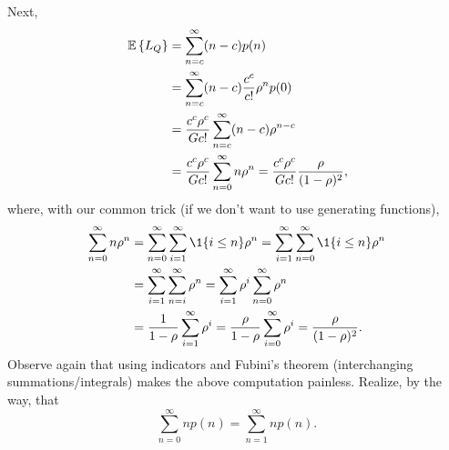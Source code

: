 \begin{question}
\begin{solution}
Next, 
\begin{equation*}
  \begin{split}
  \,\mathbb{E}\left\{L_Q\right\} 
&=\sum_{n=c}^\infty (n-c) p(n) \\
&=\sum_{n=c}^\infty (n-c) \frac{c^c}{c!}\rho^{n} p(0) \\
&=\frac{c^c\rho^c}{Gc!} \sum_{n=c}^\infty (n-c) \rho^{n-c} \\
&=\frac{c^c\rho^c}{Gc!} \sum_{n=0}^\infty n \rho^n 
=\frac{c^c\rho^c}{Gc!} \frac{\rho}{(1-\rho)^2},
  \end{split}
\end{equation*}
where, with our common trick (if we don't want to use generating functions),
\begin{equation*}
  \begin{split}
  \sum_{n=0}^\infty n \rho^n 
&= \sum_{n=0}^\infty \sum_{i=1}^\infty \1{i\leq n} \rho^n
= \sum_{i=1}^\infty   \sum_{n=0}^\infty \1{i\leq n} \rho^n\\
&= \sum_{i=1}^\infty   \sum_{n=i}^\infty \rho^n
= \sum_{i=1}^\infty   \rho^i \sum_{n=0}^\infty \rho^n\\
&= \frac1{1-\rho} \sum_{i=1}^\infty   \rho^i 
= \frac\rho{1-\rho} \sum_{i=0}^\infty   \rho^i 
= \frac\rho{(1-\rho)^2}.
  \end{split}
\end{equation*}
Observe again that using indicators and Fubini's theorem
(interchanging summations/integrals) makes the above computation
painless. Realize, by the way, that
\begin{equation*}
  \sum_{n=0}^\infty n p(n) = \sum_{n=1}^\infty n p(n).
\end{equation*}


\end{solution}
\end{question}

